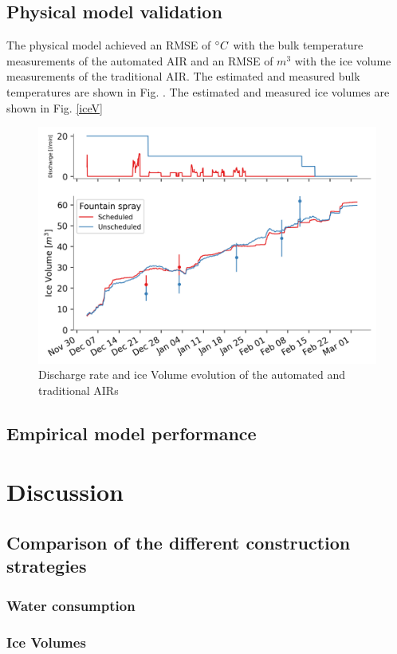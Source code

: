 \documentclass[tc, manuscript]{copernicus}
\begin{document}
\subsection{Physical model validation}
The physical model achieved an RMSE of $^{\circ} C$ with the bulk temperature measurements of the automated AIR
and an RMSE of $m^3$ with the ice volume measurements of the traditional AIR. The estimated and measured bulk
temperatures are shown in Fig. . The estimated and measured ice volumes are shown in Fig. \ref{iceV}
 
\begin{figure}[t]
\includegraphics[width=12cm]{Figures/autovsman.png}
\caption{Discharge rate and ice Volume evolution of the automated and traditional AIRs}
\label{fig:iceV}
\end{figure}

\subsection{Empirical model performance}


\section{Discussion}
\subsection{Comparison of the different construction strategies}
\subsubsection{Water consumption}
\subsubsection{Ice Volumes}
\end{document}

